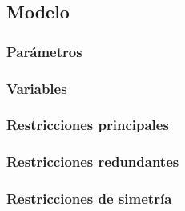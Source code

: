 
\subsection{Modelo}\label{sec:01-jobshop_tardanza-modelo}

\subsubsection*{Parámetros}

\subsubsection*{Variables}

\subsubsection*{Restricciones principales}

\subsubsection*{Restricciones redundantes}

\subsubsection*{Restricciones de simetría}
